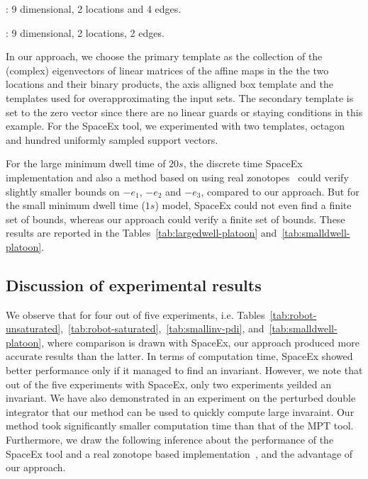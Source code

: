 : 9 dimensional, 2
locations and 4 edges.

: 9 dimensional, 2
locations, 2 edges.

  In our approach, we choose the primary template
as the collection of the (complex) eigenvectors of linear matrices of
the affine maps in the the two locations and their binary products,
the axis alligned box template and the templates used for
overapproximating the input sets.  The secondary template is set to
the zero vector since there are no linear guards or staying conditions
in this example.  For the SpaceEx tool, we experimented with two
templates, octagon and hundred uniformly sampled support vectors.

  For the large minimum dwell time of $20s$, the
discrete time SpaceEx implementation and also a method based on using
real zonotopes~\cite{makhlouf2014networked} could verify slightly
smaller bounds on $-e_1$, $-e_2$ and $-e_3$, compared to our approach.
But for the small minimum dwell time ($1s$) model, SpaceEx could not
even find a finite set of bounds, whereas our approach could verify a
finite set of bounds.  These results are reported in the
Tables~\ref{tab:largedwell-platoon} and~\ref{tab:smalldwell-platoon}.

\subsection{Discussion of experimental results}
We observe that for four out of five experiments,
i.e. Tables~\ref{tab:robot-unsaturated},~\ref{tab:robot-saturated},~\ref{tab:smallinv-pdi},
and~\ref{tab:smalldwell-platoon}, where comparison is drawn with
SpaceEx, our approach produced more accurate results than the latter.
In terms of computation time, SpaceEx showed better performance only
if it managed to find an invariant. However, we note that out of the
five experiments with SpaceEx, only two experiments yeilded an
invariant.  We have also demonstrated in an experiment on the
perturbed double integrator that our method can be used to quickly
compute large invaraint.  Our method took significantly smaller
computation time than that of the MPT tool.  Furthermore, we draw the
following inference about the performance of the SpaceEx tool and a
real zonotope based implementation~\cite{makhlouf2014networked}, and
the advantage of our approach.


